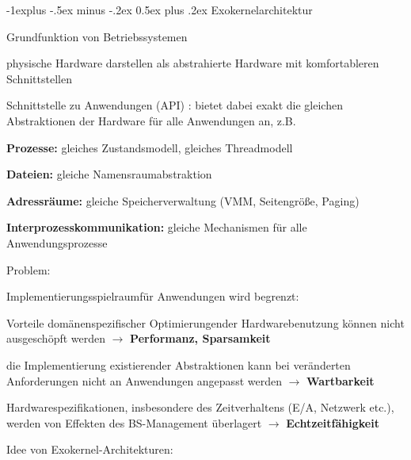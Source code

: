 \documentclass[a4paper]{article}
\makeatletter
\renewcommand{\subsection}{\@startsection{subsection}{2}{0mm}%
 {-1explus -.5ex minus -.2ex}%
 {0.5ex plus .2ex}%
 {\normalfont\normalsize\bfseries}}
\makeatother
\begin{document}
\begin{multicols}{3}
    \subsection{Exokernelarchitektur}

    \begin{itemize*}
        \item Grundfunktion von Betriebssystemen
        \begin{itemize*}
            \item physische Hardware darstellen als abstrahierte Hardware mit komfortableren Schnittstellen
            \item Schnittstelle zu Anwendungen (API) : bietet dabei exakt die gleichen Abstraktionen der Hardware für alle Anwendungen an, z.B. \begin{itemize*} \item \textbf{Prozesse:} gleiches Zustandsmodell, gleiches Threadmodell \item \textbf{Dateien:} gleiche Namensraumabstraktion \item \textbf{Adressräume:} gleiche Speicherverwaltung (VMM, Seitengröße, Paging) \item \textbf{Interprozesskommunikation:} gleiche Mechanismen für alle Anwendungsprozesse \end{itemize*}
        \end{itemize*}
        \item Problem:
        \begin{itemize*}
            \item Implementierungsspielraumfür Anwendungen wird begrenzt:
        \end{itemize*}
        \begin{enumerate*}

            \item Vorteile domänenspezifischer Optimierungender Hardwarebenutzung können nicht ausgeschöpft werden $\rightarrow$ \textbf{Performanz, Sparsamkeit}
            \item die Implementierung existierender Abstraktionen kann bei veränderten Anforderungen nicht an Anwendungen angepasst werden $\rightarrow$ \textbf{Wartbarkeit}
            \item Hardwarespezifikationen, insbesondere des Zeitverhaltens (E/A, Netzwerk etc.), werden von Effekten des BS-Management überlagert $\rightarrow$ \textbf{Echtzeitfähigkeit}
        \end{enumerate*}
        \item Idee von Exokernel-Architekturen:
    \end{itemize*}



\end{multicols}
\end{document}
